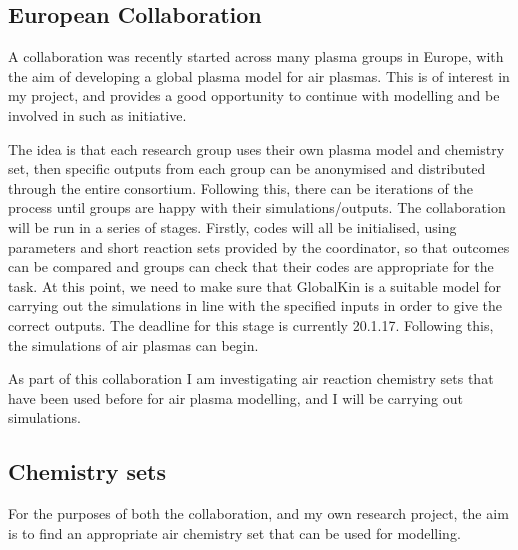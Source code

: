 \documentclass[11pt, oneside]{article}   	%
\begin{document}
\subsection*{European Collaboration}
A collaboration was recently started across many plasma groups in Europe, with the aim of developing a global plasma model for air plasmas.
This is of interest in my project, and provides a good opportunity to continue with modelling and be involved in such as initiative.

The idea is that each research group uses their own plasma model and chemistry set, then specific outputs from each group can be anonymised and distributed through the entire consortium.
Following this, there can be iterations of the process until groups are happy with their simulations/outputs.
The collaboration will be run in a series of stages.
Firstly, codes will all be initialised, using parameters and short reaction sets provided by the coordinator, so that outcomes can be compared and groups can check that their codes are appropriate for the task.
At this point, we need to make sure that GlobalKin is a suitable model for carrying out the simulations in line with the specified inputs in order to give the correct outputs.
The deadline for this stage is currently 20.1.17.
Following this, the simulations of air plasmas can begin.

As part of this collaboration I am investigating air reaction chemistry sets that have been used before for air plasma modelling, and I will be carrying out simulations.


\subsection*{Chemistry sets}
For the purposes of both the collaboration, and my own research project, the aim is to find an appropriate air chemistry set that can be used for modelling.
\end{document}
